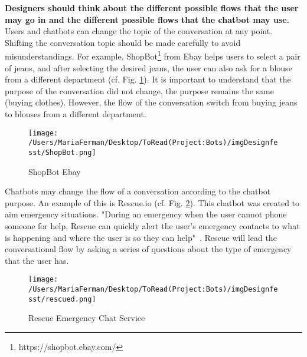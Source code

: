 \documentclass[a4paper,10pt]{article}
\begin{document}
\textbf{Designers should think about the different possible flows that the user may go in and the different possible flows that the chatbot may use.} Users and chatbots can change the topic of the conversation at any point. Shifting the conversation topic should be made carefully to avoid misunderstandings. For example, ShopBot\footnote{https://shopbot.ebay.com/} from Ebay helps users to select a pair of jeans, and after selecting the desired jeans, the user can also ask for a blouse from a different department (cf. Fig. \ref{FigureEbay}). It is important to understand that the purpose of the conversation did not change, the purpose remains the same (buying clothes). However, the flow of the conversation switch from buying jeans to blouses from a different department.
\begin{figure}
\centering
\texttt{[image: /Users/MariaFerman/Desktop/ToRead(Project:Bots)/imgDesignfesst/ShopBot.png]}
\caption{ShopBot Ebay}
\label{FigureEbay}
\end{figure}
Chatbots may change the flow of a conversation according to the chatbot purpose. An example of this is Rescue.io (cf. Fig. \ref{FigureRescue}). This chatbot was created to aim emergency situations. "During an emergency when the user cannot phone someone for help, Rescue can quickly alert the user's emergency contacts to what is happening and where the user is so they can help"~\cite{Rescue}. Rescue will lead the conversational flow by asking a series of questions about the type of emergency that the user has. 
\begin{figure}
\centering
\texttt{[image: /Users/MariaFerman/Desktop/ToRead(Project:Bots)/imgDesignfesst/rescued.png]}
\caption{Rescue Emergency Chat Service}
\label{FigureRescue}
\end{figure}
\end{document}
